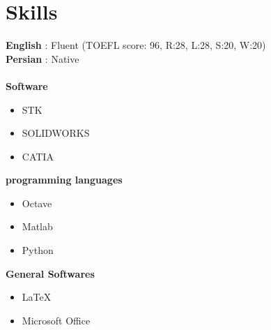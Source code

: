\documentclass[10pt,a4paper,sans]{moderncv} %
\begin{document}




\section{Skills}

\textbf{English} : Fluent (TOEFL score: 96, R:28, L:28, S:20, W:20) \\
\textbf{Persian} : Native
\\
\\
\textbf{Software}
\begin{itemize}
\item{STK}
\item{SOLIDWORKS}
\item{CATIA}
\end{itemize}
\textbf{programming languages}
\begin{itemize}
\item {Octave}
\item {Matlab}
\item{Python}
\end{itemize}
\textbf{General Softwares}
\begin{itemize}
\item {LaTeX}
\item {Microsoft Office}
\end{itemize}
\end{document}
